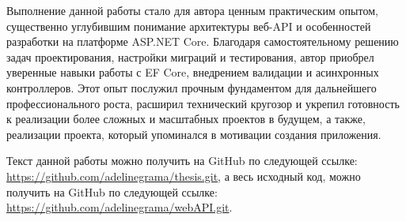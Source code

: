 \documentclass[a4paper,12pt]{report}
\renewcommand{\year}{2025}
\newcommand{\conferencesList}{Conferința Studențească, Editia XXVIII-a, \year}
\newcommand{\githubthesis}{\url{https://github.com/adelinegrama/thesis.git}}
\newcommand{\githubwebAPI}{\url{https://github.com/adelinegrama/webAPI.git}}
\begin{document}
Выполнение данной работы стало для автора ценным практическим опытом, существенно углубившим понимание 
архитектуры веб-\acs{API} и особенностей разработки на платформе ASP.NET Core. 
Благодаря самостоятельному решению задач проектирования, настройки миграций и тестирования, 
автор приобрел уверенные навыки работы с \acs{EF} Core, внедрением валидации и асинхронных контроллеров. 
Этот опыт послужил прочным фундаментом для дальнейшего профессионального роста, расширил технический 
кругозор и укрепил готовность к реализации более сложных и масштабных проектов в будущем, а также, 
реализации проекта, который упоминался в мотивации создания приложения.


Текст данной работы можно получить на GitHub по следующей ссылке: \githubthesis, 
а весь исходный код, можно получить на GitHub по следующей ссылке: \githubwebAPI.


\newpage
{}















\end{document}

